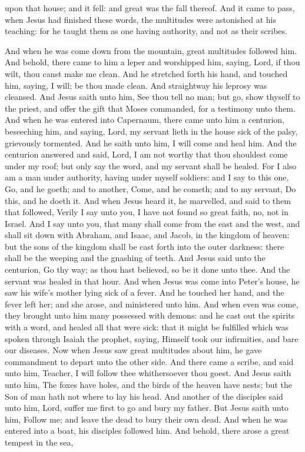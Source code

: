 upon that house; and it fell: and great was the fall thereof.  And it came to pass, when Jesus had finished these words, the multitudes were astonished at his teaching: for he taught them as one having authority, and not as their scribes. 

And when he was come down from the mountain, great multitudes followed him. And behold, there came to him a leper and worshipped him, saying, Lord, if thou wilt, thou canst make me clean. And he stretched forth his hand, and touched him, saying, I will; be thou made clean. And straightway his leprosy was cleansed. And Jesus saith unto him, See thou tell no man; but go, show thyself to the priest, and offer the gift that Moses commanded, for a testimony unto them.  And when he was entered into Capernaum, there came unto him a centurion, beseeching him, and saying, Lord, my servant lieth in the house sick of the palsy, grievously tormented. And he saith unto him, I will come and heal him. And the centurion answered and said, Lord, I am not worthy that thou shouldest come under my roof; but only say the word, and my servant shall be healed. For I also am a man under authority, having under myself soldiers: and I say to this one, Go, and he goeth; and to another, Come, and he cometh; and to my servant, Do this, and he doeth it. And when Jesus heard it, he marvelled, and said to them that followed, Verily I say unto you, I have not found so great faith, no, not in Israel. And I say unto you, that many shall come from the east and the west, and shall sit down with Abraham, and Isaac, and Jacob, in the kingdom of heaven: but the sons of the kingdom shall be cast forth into the outer darkness: there shall be the weeping and the gnashing of teeth. And Jesus said unto the centurion, Go thy way; as thou hast believed, so be it done unto thee. And the servant was healed in that hour.  And when Jesus was come into Peter’s house, he saw his wife’s mother lying sick of a fever. And he touched her hand, and the fever left her; and she arose, and ministered unto him. And when even was come, they brought unto him many possessed with demons: and he cast out the spirits with a word, and healed all that were sick: that it might be fulfilled which was spoken through Isaiah the prophet, saying, Himself took our infirmities, and bare our diseases.  Now when Jesus saw great multitudes about him, he gave commandment to depart unto the other side. And there came a scribe, and said unto him, Teacher, I will follow thee whithersoever thou goest. And Jesus saith unto him, The foxes have holes, and the birds of the heaven have nests; but the Son of man hath not where to lay his head. And another of the disciples said unto him, Lord, suffer me first to go and bury my father. But Jesus saith unto him, Follow me; and leave the dead to bury their own dead.  And when he was entered into a boat, his disciples followed him. And behold, there arose a great tempest in the sea, 